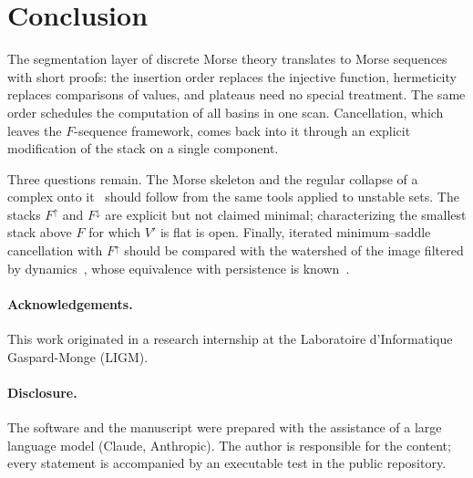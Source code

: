 \documentclass[runningheads]{llncs}
\newcommand{\Fup}{F^{\uparrow}}
\newcommand{\Fdown}{F^{\downarrow}}
\begin{document}
\section{Conclusion}

The segmentation layer of discrete Morse theory translates to Morse
sequences with short proofs: the insertion order replaces the injective
function, hermeticity replaces comparisons of values, and plateaus need no
special treatment. The same order schedules the computation of all basins
in one scan. Cancellation, which leaves the $F$-sequence framework, comes
back into it through an explicit modification of the stack on a single
component.

Three questions remain. The Morse skeleton and the regular collapse of a
complex onto it~\cite{DFRS15} should follow from the same tools applied to
unstable sets. The stacks $\Fup$ and $\Fdown$ are explicit but not claimed
minimal; characterizing the smallest stack above $F$ for which $V'$ is flat
is open. Finally, iterated minimum--saddle cancellation with $\Fup$ should
be compared with the watershed of the image filtered by
dynamics~\cite{Grimaud92,NS96}, whose equivalence with persistence is
known~\cite{BNG22}.

\paragraph{Acknowledgements.}
This work originated in a research internship at the Laboratoire
d'Informatique Gaspard-Monge (LIGM).

\paragraph{Disclosure.}
The software and the manuscript were prepared with the assistance of a
large language model (Claude, Anthropic). The author is responsible for
the content; every statement is accompanied by an executable test in the
public repository.



\end{document}
